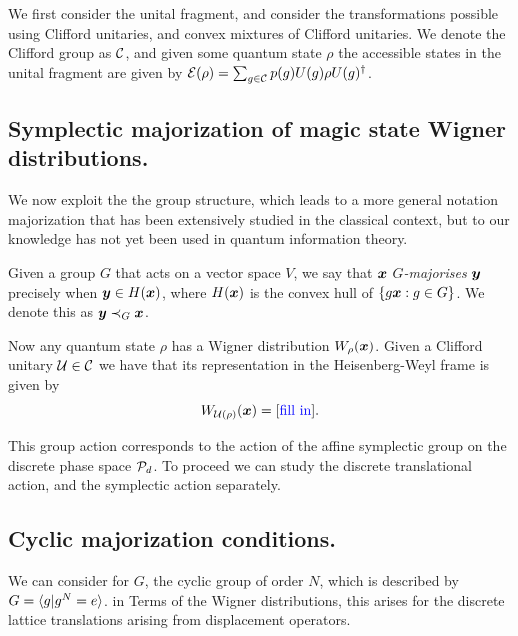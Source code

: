 \documentclass[pra,
aps,
twocolumn,
superscriptaddress,
groupedaddress,
nofootinbib,
reprint
]{revtex4-1}
\begin{document}
We first consider the unital fragment, and consider the transformations possible using Clifford unitaries, and convex mixtures of Clifford unitaries. We denote the Clifford group as $\C$, and given some quantum state $\rho$ the accessible states in the unital fragment are given by $\E(\rho) = \sum_{g \in \C} p(g) U(g) \rho U(g)^\dagger$.

\subsection{Symplectic majorization of magic state Wigner distributions.}
We now exploit the the group structure, which leads to a more general notation majorization that has been extensively studied in the classical context, but to our knowledge has not yet been used in quantum information theory.

\begin{definition} Given a group $G$ that acts on a vector space $V$, we say that $\bmx$ \emph{$G$-majorises} $\bmy$ precisely when $\y \in H(\x)$, where $H(\x)$ is the convex hull of $\{g \x : g \in G\}$. We denote this as $\y \prec_G \x$.
\end{definition}

Now any quantum state $\rho$ has a Wigner distribution $W_\rho(\x)$. Given a Clifford unitary $\U \in \C$ we have that its representation in the Heisenberg-Weyl frame is given by
\begin{equation}
W_{\U(\rho)} (\x) = [\mbox{\ddd{fill in}}].
\end{equation}

This group action corresponds to the action of the affine symplectic group on the discrete phase space $\P_d$. To proceed we can study the discrete translational action, and the symplectic action separately.

\subsection{Cyclic majorization conditions.}
We can consider for $G$, the cyclic group of order $N$, which is described by $G= \< g | g^N = e\>$. in Terms of the Wigner distributions, this arises for the discrete lattice translations arising from displacement operators.
\end{document}
